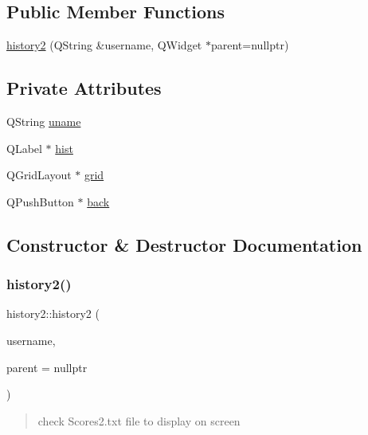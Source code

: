 \subsection*{Public Member Functions}
\begin{DoxyCompactItemize}
\item 
\hyperlink{classhistory2_aa90b74bf7753c2814827754f886830f6}{history2} (Q\+String \&username, Q\+Widget $\ast$parent=nullptr)
\end{DoxyCompactItemize}
\subsection*{Private Attributes}
\begin{DoxyCompactItemize}
\item 
Q\+String \hyperlink{classhistory2_a4cd050b461e20f2a67a4701840f38168}{uname}
\item 
Q\+Label $\ast$ \hyperlink{classhistory2_af66bf8350aae615ff0c3bf0b3b488dc3}{hist}
\item 
Q\+Grid\+Layout $\ast$ \hyperlink{classhistory2_aa5e784862787ed57ab8fb579c4b15e49}{grid}
\item 
Q\+Push\+Button $\ast$ \hyperlink{classhistory2_a0470bbf998bbce52a6e796b074d468e4}{back}
\end{DoxyCompactItemize}


\subsection{Constructor \& Destructor Documentation}
\mbox{\label{classhistory2_aa90b74bf7753c2814827754f886830f6}} 
\subsubsection{\texorpdfstring{history2()}{history2()}}
{\footnotesize\ttfamily history2\+::history2 (\begin{DoxyParamCaption}\item[{Q\+String \&}]{username,  }\item[{Q\+Widget $\ast$}]{parent = {\ttfamily nullptr} }\end{DoxyParamCaption})}

\begin{quote}
check Scores2.\+txt file to display on screen \end{quote}


